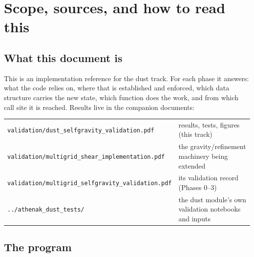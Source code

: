 \documentclass[11pt]{article}
\newcommand{\file}[1]{\texttt{\small #1}}
\begin{document}
\begin{abstract}
The document also records, for the phases that follow, the integration map derived
from the code survey: where the gravity solve is called relative to the dust task
graph, the three places the solver reads density, the ghost-width contract of the
potential, and the design chosen for the particle force (grid gradient, exchanged
and shear-remapped like the module's provisional gas velocity, gathered with the
deposit kernel), together with the known gaps that Phases 4b--4d must close.
\end{abstract}

\tableofcontents
\newpage

\section{Scope, sources, and how to read this}
\label{sec:scope}

\subsection{What this document is}

This is an implementation reference for the dust track. For each phase it answers:
what the code relies on, where that is established and enforced, which data
structure carries the new state, which function does the work, and from which call
site it is reached. Results live in the companion documents:

\begin{center}
\small
\begin{tabular}{@{}>{\raggedright\arraybackslash}p{7.4cm}>{\raggedright\arraybackslash}p{7.6cm}@{}}
\toprule
\file{validation/dust\_selfgravity\_validation.pdf} & results, tests, figures (this track) \\
\file{validation/multigrid\_shear\_implementation.pdf} & the gravity/refinement machinery being extended \\
\file{validation/multigrid\_selfgravity\_validation.pdf} & its validation record (Phases 0--3) \\
\file{../athenak\_dust\_tests/} & the dust module's own validation notebooks and inputs \\
\bottomrule
\end{tabular}
\end{center}

\subsection{The program}
\label{sec:program}
\end{document}
